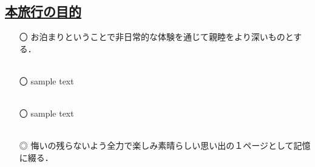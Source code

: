 \begin{center}
	\section*{\underline{\fontsize{45pt}{20pt}\selectfont 本旅行の目的}}
\end{center}
\vspace{1.5cm}

\begin{itemize}
	\item[〇]お泊まりということで非日常的な体験を通じて親睦をより深いものとする．\\\\
	\item[〇]sample text\\\\
	\item[〇]sample text\\\\
	\item[◎]悔いの残らないよう全力で楽しみ素晴らしい思い出の１ページとして記憶に綴る．\\\\
\end{itemize}



